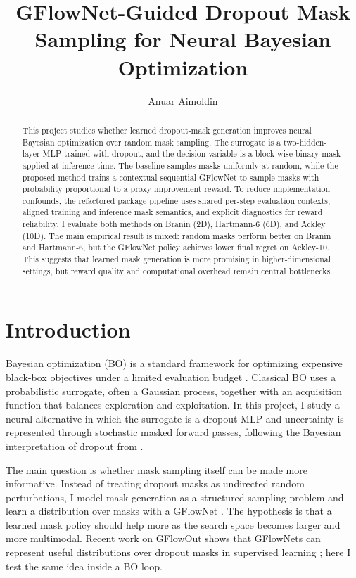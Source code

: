 \documentclass{article}
\title{GFlowNet-Guided Dropout Mask Sampling for Neural Bayesian Optimization}
\author{Anuar Aimoldin}
\date{}
\begin{document}
\maketitle

\begin{abstract}
This project studies whether learned dropout-mask generation improves neural Bayesian optimization over random mask sampling. The surrogate is a two-hidden-layer MLP trained with dropout, and the decision variable is a block-wise binary mask applied at inference time. The baseline samples masks uniformly at random, while the proposed method trains a contextual sequential GFlowNet to sample masks with probability proportional to a proxy improvement reward. To reduce implementation confounds, the refactored package pipeline uses shared per-step evaluation contexts, aligned training and inference mask semantics, and explicit diagnostics for reward reliability. I evaluate both methods on Branin (2D), Hartmann-6 (6D), and Ackley (10D). The main empirical result is mixed: random masks perform better on Branin and Hartmann-6, but the GFlowNet policy achieves lower final regret on Ackley-10. This suggests that learned mask generation is more promising in higher-dimensional settings, but reward quality and computational overhead remain central bottlenecks.
\end{abstract}

\section{Introduction}

Bayesian optimization (BO) is a standard framework for optimizing expensive black-box objectives under a limited evaluation budget \cite{snoek2012practical}. Classical BO uses a probabilistic surrogate, often a Gaussian process, together with an acquisition function that balances exploration and exploitation. In this project, I study a neural alternative in which the surrogate is a dropout MLP and uncertainty is represented through stochastic masked forward passes, following the Bayesian interpretation of dropout from \citet{gal2016dropout}.

The main question is whether mask sampling itself can be made more informative. Instead of treating dropout masks as undirected random perturbations, I model mask generation as a structured sampling problem and learn a distribution over masks with a GFlowNet \cite{bengio2023gflownet}. The hypothesis is that a learned mask policy should help more as the search space becomes larger and more multimodal. Recent work on GFlowOut shows that GFlowNets can represent useful distributions over dropout masks in supervised learning \cite{liu2023gflowout}; here I test the same idea inside a BO loop.
\end{document}
